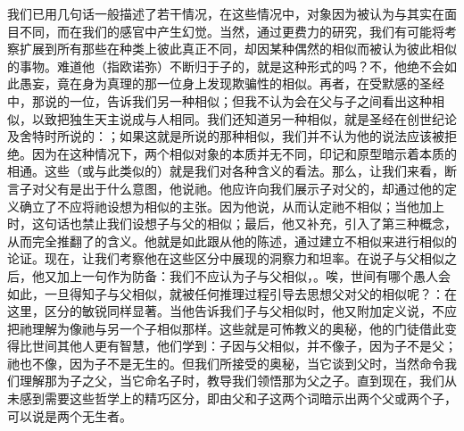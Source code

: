 我们已用几句话一般描述了若干情况，在这些情况中，对象因为被认为与其实在面目不同，而在我们的感官中产生幻觉。当然，通过更费力的研究，我们有可能将考察扩展到所有那些在种类上彼此真正不同，却因某种偶然的相似而被认为彼此相似的事物。难道他（指欧诺弥）不断归于子的，就是这种形式的吗？不，他绝不会如此愚妄，竟在身为真理的那一位身上发现欺骗性的相似。再者，在受默感的圣经中，那说的一位，告诉我们另一种相似；但我不认为会在父与子之间看出这种相似，以致把独生天主说成与人相同。我们还知道另一种相似，就是圣经在创世纪论及舍特时所说的：；如果这就是所说的那种相似，我们并不认为他的说法应该被拒绝。因为在这种情况下，两个相似对象的本质并无不同，印记和原型暗示着本质的相通。这些（或与此类似的）就是我们对各种含义的看法。\newline{}\newline{}那么，让我们来看，断言子对父有是出于什么意图，他说祂。他应许向我们展示子对父的，却通过他的定义确立了不应将祂设想为相似的主张。因为他说，从而认定祂不相似；当他加上时，这句话也禁止我们设想子与父的相似；最后，他又补充，引入了第三种概念，从而完全推翻了的含义。他就是如此跟从他的陈述，通过建立不相似来进行相似的论证。\newline{}\newline{}现在，让我们考察他在这些区分中展现的洞察力和坦率。在说子与父相似之后，他又加上一句作为防备：我们不应认为子与父相似，。唉，世间有哪个愚人会如此，一旦得知子与父相似，就被任何推理过程引导去思想父对父的相似呢？：在这里，区分的敏锐同样显著。当他告诉我们子与父相似时，他又附加定义说，不应把祂理解为像祂与另一个子相似那样。这些就是可怖教义的奥秘，他的门徒借此变得比世间其他人更有智慧，他们学到：子因与父相似，并不像子，因为子不是父；祂也不像，因为子不是无生的。但我们所接受的奥秘，当它谈到父时，当然命令我们理解那为子之父，当它命名子时，教导我们领悟那为父之子。直到现在，我们从未感到需要这些哲学上的精巧区分，即由父和子这两个词暗示出两个父或两个子，可以说是两个无生者。\par

